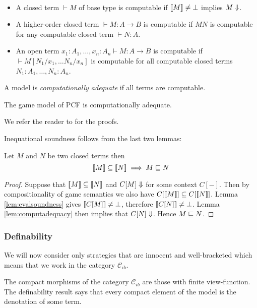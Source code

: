 \begin{dfn} \
\begin{itemize}
\item A closed term $\vdash M$ of base type is computable if ${[\![ M ]\!]} \neq \bot$
implies $M \Downarrow$.
\item A higher-order closed term $\vdash M : A\rightarrow B$ is computable if $M N$ is computable for any computable closed term $\vdash  N:A$.
\item An open term $x_1 : A_1, \ldots, x_n : A_n \vdash M : A\rightarrow B$ is computable if $\vdash M [N_1/x_1, \ldots N_n/x_n]$ is computable
for all computable closed terms $N_1:A_1, \ldots, N_n:A_n$.
\end{itemize}
\end{dfn}

A model is \emph{computationally adequate} if all
terms are computable.
\begin{lem}
\label{lem:computadequacy}
The game model of PCF is
computationally adequate.
\end{lem}
We refer the reader to \cite{abramsky:game-semantics-tutorial} for
the proofs.

Inequational soundness follows from the last two lemmas:
\begin{prop}
\label{prop:ineqsoundness} Let $M$ and $N$ be two closed terms then
$${[\![ M ]\!]} \subseteq {[\![N ]\!]} \implies  M \sqsubseteq N $$
\end{prop}
\begin{proof}
  Suppose that ${[\![ M ]\!]} \subseteq {[\![N ]\!]}$ and $C[M] \Downarrow$ for some context $C[-]$. Then by compositionality of game semantics we also have
  $C[{[\![ M ]\!]}] \subseteq C[{[\![ N ]\!]}]$.
  Lemma \ref{lem:evalsoundness} gives ${[\![ C[M] ]\!]} \neq \bot$, therefore ${[\![ C[N] ]\!]} \neq \bot$.
  Lemma \ref{lem:computadequacy} then implies that $C[N] \Downarrow$.
  Hence $M \sqsubseteq N$.
\end{proof}

\subsubsection{Definability}

We will now consider only strategies that are innocent and
well-bracketed which means that we work in the category
$\mathcal{C}_{ib}$.

The compact morphisms of the category $\mathcal{C}_{ib}$ are those
with finite view-function. The definability result says that every
compact element of the model is the denotation of some term.

